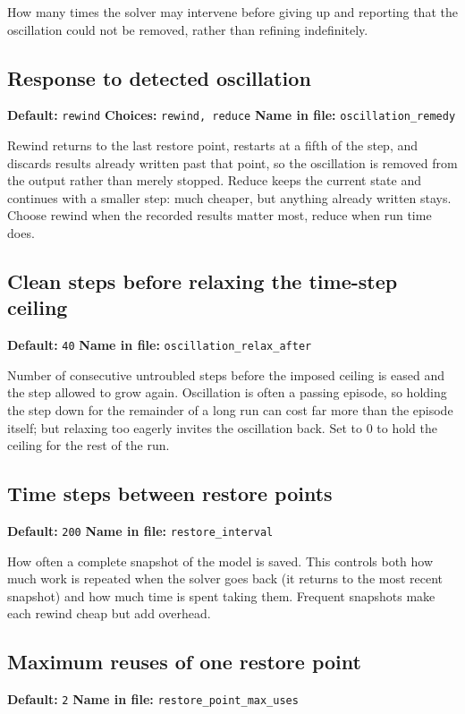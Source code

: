 \documentclass[11pt]{article}
\begin{document}
How many times the solver may intervene before giving up and reporting that the oscillation could not be removed, rather than refining indefinitely.
\subsection{Response to detected oscillation}
{\small \textbf{Default:} \texttt{rewind} \quad\textbullet\quad \textbf{Choices:} \texttt{rewind, reduce} \quad\textbullet\quad \textbf{Name in file:} \texttt{oscillation\_\allowbreak{}remedy}}

Rewind returns to the last restore point, restarts at a fifth of the step, and discards results already written past that point, so the oscillation is removed from the output rather than merely stopped. Reduce keeps the current state and continues with a smaller step: much cheaper, but anything already written stays. Choose rewind when the recorded results matter most, reduce when run time does.
\subsection{Clean steps before relaxing the time-step ceiling}
{\small \textbf{Default:} \texttt{40} \quad\textbullet\quad \textbf{Name in file:} \texttt{oscillation\_\allowbreak{}relax\_\allowbreak{}after}}

Number of consecutive untroubled steps before the imposed ceiling is eased and the step allowed to grow again. Oscillation is often a passing episode, so holding the step down for the remainder of a long run can cost far more than the episode itself; but relaxing too eagerly invites the oscillation back. Set to 0 to hold the ceiling for the rest of the run.
\subsection{Time steps between restore points}
{\small \textbf{Default:} \texttt{200} \quad\textbullet\quad \textbf{Name in file:} \texttt{restore\_\allowbreak{}interval}}

How often a complete snapshot of the model is saved. This controls both how much work is repeated when the solver goes back (it returns to the most recent snapshot) and how much time is spent taking them. Frequent snapshots make each rewind cheap but add overhead.
\subsection{Maximum reuses of one restore point}
{\small \textbf{Default:} \texttt{2} \quad\textbullet\quad \textbf{Name in file:} \texttt{restore\_\allowbreak{}point\_\allowbreak{}max\_\allowbreak{}uses}}
\end{document}
